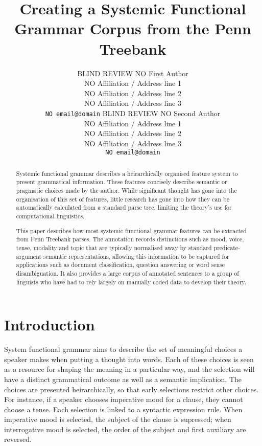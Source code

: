 \documentclass[11pt]{article}
\title{Creating a Systemic Functional Grammar Corpus from the Penn Treebank}
\author{BLIND REVIEW NO First Author\\
  NO Affiliation / Address line 1\\
  NO Affiliation / Address line 2\\
  NO Affiliation / Address line 3\\
  {\tt NO email@domain}  \And
  BLIND REVIEW NO Second Author\\
  NO Affiliation / Address line 1\\
  NO Affiliation / Address line 2\\
  NO Affiliation / Address line 3\\
  {\tt NO email@domain}}
\date{}
\begin{document}
\maketitle

\begin{abstract}
Systemic functional grammar describes a heirarchically organised feature system to present grammatical information. These features concisely describe semantic or pragmatic choices made by the author. While significant thought has gone into the organisation of this set of features, little research has gone into how they can be automatically calculated from a standard parse tree, limiting the theory's use for computational linguistics.

This paper describes how most systemic functional grammar features can be extracted from Penn Treebank parses. The annotation records distinctions such as mood, voice, tense, modality and topic that are typically normalised away by standard predicate-argument semantic representations, allowing this information to be captured for applications such as document classification, question answering or word sense disambiguation. It also provides a large corpus of annotated sentences to a group of linguists who have had to rely largely on manually coded data to develop their theory.

\end{abstract}

\section{Introduction}

System functional grammar \citep{ifg} aims to describe the set of meaningful choices a speaker makes when putting a thought into words. Each of these choices is seen as a resource for shaping the meaning in a particular way, and the selection will have a distinct grammatical outcome as well as a semantic implication. The choices are presented heirarchically, so that early selections restrict other choices. For instance, if a speaker chooses imperative mood for a clause, they cannot choose a tense. Each selection is linked to a syntactic expression rule. When imperative mood is selected, the subject of the clause is supressed; when interrogative mood is selected, the order of the subject and first auxiliary are reversed.
\end{document}
